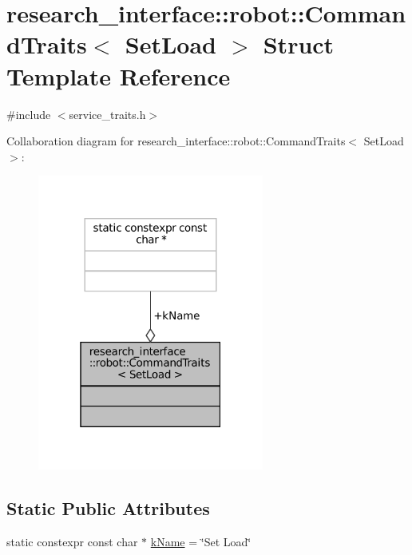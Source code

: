 \hypertarget{structresearch__interface_1_1robot_1_1CommandTraits_3_01SetLoad_01_4}{}\section{research\+\_\+interface\+:\+:robot\+:\+:Command\+Traits$<$ Set\+Load $>$ Struct Template Reference}
\label{structresearch__interface_1_1robot_1_1CommandTraits_3_01SetLoad_01_4}


{\ttfamily \#include $<$service\+\_\+traits.\+h$>$}



Collaboration diagram for research\+\_\+interface\+:\+:robot\+:\+:Command\+Traits$<$ Set\+Load $>$\+:
\nopagebreak
\begin{figure}[H]
\begin{center}
\leavevmode
\includegraphics[width=211pt]{structresearch__interface_1_1robot_1_1CommandTraits_3_01SetLoad_01_4__coll__graph}
\end{center}
\end{figure}
\subsection*{Static Public Attributes}
\begin{DoxyCompactItemize}
\item 
static constexpr const char $\ast$ \hyperlink{structresearch__interface_1_1robot_1_1CommandTraits_3_01SetLoad_01_4_a904c133ad4dcd761834be83b17da8184}{k\+Name} = \char`\"{}Set Load\char`\"{}
\end{DoxyCompactItemize}


